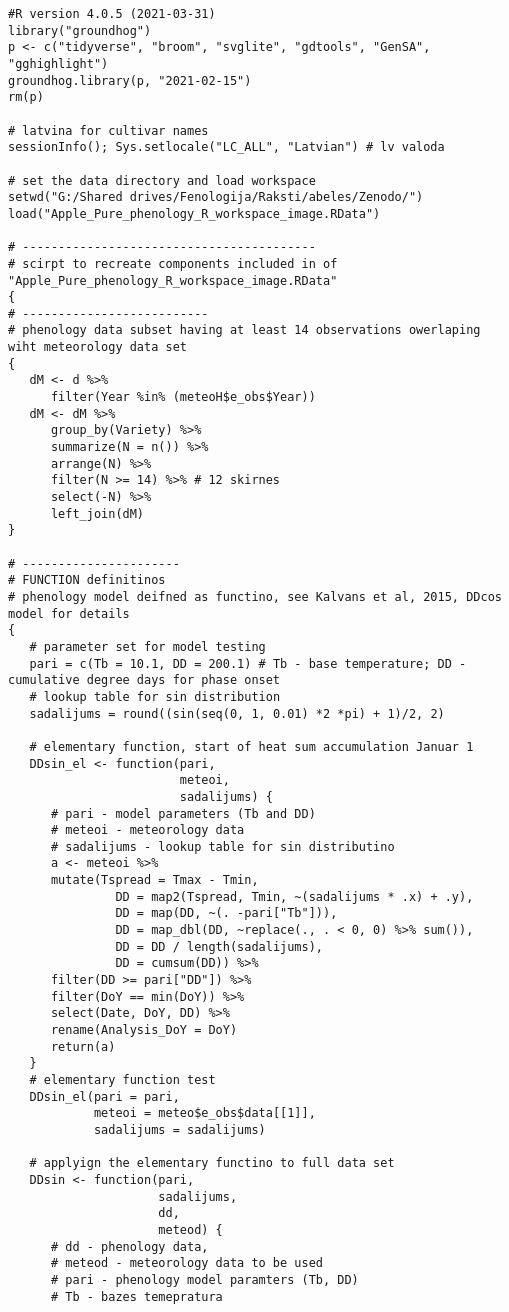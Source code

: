 

\preview\footnotesize
\begin{verbatim}
#R version 4.0.5 (2021-03-31)
library("groundhog")
p <- c("tidyverse", "broom", "svglite", "gdtools", "GenSA", "gghighlight")
groundhog.library(p, "2021-02-15")
rm(p)

# latvina for cultivar names
sessionInfo(); Sys.setlocale("LC_ALL", "Latvian") # lv valoda

# set the data directory and load workspace
setwd("G:/Shared drives/Fenologija/Raksti/abeles/Zenodo/")
load("Apple_Pure_phenology_R_workspace_image.RData")

# -----------------------------------------
# scirpt to recreate components included in of "Apple_Pure_phenology_R_workspace_image.RData"
{
# --------------------------
# phenology data subset having at least 14 observations owerlaping wiht meteorology data set
{
   dM <- d %>%
      filter(Year %in% (meteoH$e_obs$Year))
   dM <- dM %>%
      group_by(Variety) %>%
      summarize(N = n()) %>%
      arrange(N) %>%
      filter(N >= 14) %>% # 12 skirnes
      select(-N) %>%
      left_join(dM)
}

# ----------------------
# FUNCTION definitinos
# phenology model deifned as functino, see Kalvans et al, 2015, DDcos model for details
{
   # parameter set for model testing
   pari = c(Tb = 10.1, DD = 200.1) # Tb - base temperature; DD - cumulative degree days for phase onset
   # lookup table for sin distribution
   sadalijums = round((sin(seq(0, 1, 0.01) *2 *pi) + 1)/2, 2)

   # elementary function, start of heat sum accumulation Januar 1
   DDsin_el <- function(pari,
                        meteoi,
                        sadalijums) {
      # pari - model parameters (Tb and DD)
      # meteoi - meteorology data
      # sadalijums - lookup table for sin distributino
      a <- meteoi %>%
      mutate(Tspread = Tmax - Tmin,
               DD = map2(Tspread, Tmin, ~(sadalijums * .x) + .y),
               DD = map(DD, ~(. -pari["Tb"])),
               DD = map_dbl(DD, ~replace(., . < 0, 0) %>% sum()),
               DD = DD / length(sadalijums),
               DD = cumsum(DD)) %>%
      filter(DD >= pari["DD"]) %>%
      filter(DoY == min(DoY)) %>%
      select(Date, DoY, DD) %>%
      rename(Analysis_DoY = DoY)
      return(a)
   }
   # elementary function test
   DDsin_el(pari = pari,
            meteoi = meteo$e_obs$data[[1]],
            sadalijums = sadalijums)

   # applyign the elementary functino to full data set
   DDsin <- function(pari,
                     sadalijums,
                     dd,
                     meteod) {
      # dd - phenology data,
      # meteod - meteorology data to be used
      # pari - phenology model paramters (Tb, DD)
      # Tb - bazes temepratura


\end{verbatim}
